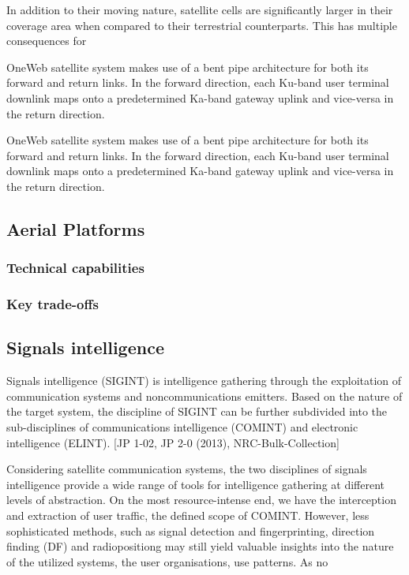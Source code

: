 \documentclass[english, 12pt, a4paper, elec, utf8, a-1b, online]{aaltothesis}
\begin{document}
In addition to their moving nature, satellite cells are significantly larger in their coverage area when compared to their terrestrial counterparts. This has multiple consequences for 
 \cite{corson2019admission}

 OneWeb satellite system makes use of a bent pipe architecture for both its forward and return links. In the forward direction, each Ku-band user terminal downlink maps onto a predetermined Ka-band gateway uplink and vice-versa in the return direction. \cite{worldvu2016loi, portillo2019technical}

OneWeb satellite system makes use of a bent pipe architecture for both its forward and return links. In the forward direction, each Ku-band user terminal downlink maps onto a predetermined Ka-band gateway uplink and vice-versa in the return direction. \cite{worldvu2016loi, portillo2019technical}

\subsection{Aerial Platforms}
\subsubsection{Technical capabilities}
\subsubsection{Key trade-offs}

\subsection{Signals intelligence}
Signals intelligence (SIGINT) is intelligence gathering through the exploitation of communication systems and noncommunications emitters. Based on the nature of the target system, the discipline of SIGINT can be further subdivided into the sub-disciplines of communications intelligence (COMINT) and electronic intelligence (ELINT). [JP 1-02, JP 2-0 (2013), NRC-Bulk-Collection]

Considering satellite communication systems, the two disciplines of signals intelligence provide a wide range of tools for intelligence gathering at different levels of abstraction. On the most resource-intense end, we have the interception and extraction of user traffic, the defined scope of COMINT. However, less sophisticated methods, such as signal detection and fingerprinting, direction finding (DF) and radiopositiong may still yield valuable insights into the nature of the utilized systems, the user organisations, use patterns. As no 
\end{document}
